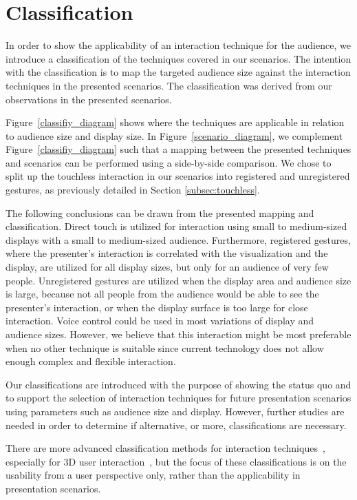 \documentclass[journal]{vgtc}                %
\begin{document}
\section{Classification} \label{sec:classification}

In order to show the applicability of an interaction technique for the audience, we introduce a classification of the techniques covered in our scenarios. The intention with the classification is to map the targeted audience size against the interaction techniques in the presented scenarios. The classification was derived from our observations in the presented scenarios.

Figure~\ref{classifiy_diagram} shows where the techniques are applicable in relation to audience size and display size. 
In Figure~\ref{scenario_diagram}, we complement Figure~\ref{classifiy_diagram} such that a mapping between the presented techniques and scenarios can be performed using a side-by-side comparison. We chose to split up the touchless interaction in our scenarios into registered and unregistered gestures, as previously detailed in Section \ref{subsec:touchless}.

The following conclusions can be drawn from the presented mapping and classification. Direct touch is utilized for interaction using small to medium-sized displays with a small to medium-sized audience. 
Furthermore, registered gestures, where the presenter's interaction is correlated with the visualization and the display, are utilized for all display sizes, but only for an audience of very few people.
Unregistered gestures are utilized when the display area and audience size is large, because not all people from the audience would be able to see the presenter's interaction, or when the display surface is too large for close interaction.
Voice control could be used in most variations of display and audience sizes. However, we believe that this interaction might be most preferable when no other technique is suitable since current technology does not allow enough complex and flexible interaction.

Our classifications are introduced with the purpose of showing the status quo and to support the selection of interaction techniques for future presentation scenarios using parameters such as audience size and display. However, further studies are needed in order to determine if alternative, or more, classifications are necessary.

There are more advanced classification methods for interaction techniques~\cite{stars:65-93:2012}, especially for 3D user interaction~\cite{978-3-319-07458-0_1, CGF:CGF194, Kettner95aclassification}, but the focus of these classifications is on the usability from a user perspective only, rather than the applicability in presentation scenarios.
\end{document}
